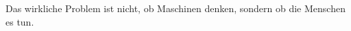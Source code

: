 \thispagestyle{empty}
\vspace*{16cm}

\hfill\parbox{7cm}{\large
	Das wirkliche Problem ist nicht, ob Maschinen denken, sondern
	ob die Menschen es tun.
	}

